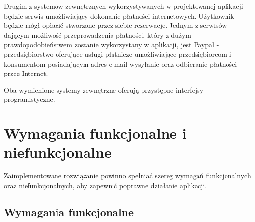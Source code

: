 \documentclass[a4paper,11pt]{article}
\begin{document}
    Drugim z systemów zewnętrznych wykorzystywanych w projektowanej aplikacji będzie serwis umożliwiający dokonanie płatności internetowych. Użytkownik będzie mógł opłacić stworzone przez siebie rezerwacje. Jednym z serwisów dającym możliwość przeprowadzenia płatności, który z dużym prawdopodobieństwem zostanie wykorzystany w aplikacji, jest Paypal - przedsiębiorstwo oferujące usługi płatnicze umożliwiające przedsiębiorcom i konsumentom posiadającym adres e-mail wysyłanie oraz odbieranie płatności przez Internet.

    Oba wymienione systemy zewnętrzne oferują przystępne interfejsy programistyczne.

\section{Wymagania funkcjonalne i niefunkcjonalne}

    Zaimplementowane rozwiązanie powinno spełniać szereg wymagań funkcjonalnych oraz niefunkcjonalnych, aby zapewnić poprawne działanie aplikacji.

    \subsection{Wymagania funkcjonalne} 
\end{document}
